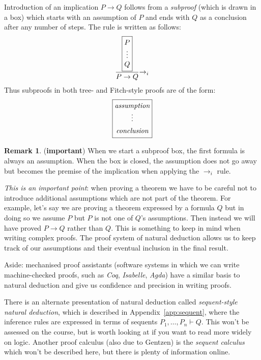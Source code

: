 \documentclass{article}
\theoremstyle{definition}
\newtheorem*{remark}{Remark}
\begin{document}
Introduction of an implication $P \rightarrow Q$ follows from a
\emph{subproof} (which is drawn in a box) which starts with an
assumption of $P$ and ends with $Q$ as a conclusion after any number
of steps. The rule is written as follows:
%
\begin{align*}
\setlength{\arraycolsep}{0em}
\dfrac{\fbox{$\begin{array}{c} P \\ \vdots \\ Q\end{array}$}}
      {P \rightarrow Q} {\rightarrow_i}
\end{align*}
%
Thus subproofs in both tree- and Fitch-style proofs
are of the form:
%
\begin{equation*}
\setlength{\arraycolsep}{0em}
\fbox{$\begin{array}{c} \textit{assumption} \\ \vdots \\[0.5em]
         \textit{conclusion} \end{array}$}
\end{equation*}
%
\begin{remark} (\textbf{important})
%
  When we start a subproof box, the first formula is always an
  assumption. When the box is closed, the assumption does not go away
  but becomes the premise of the implication when applying the
  $\rightarrow_i$ rule.

  \emph{This is an important point}: when proving a theorem we
  have to be careful not to introduce additional assumptions which are
  not part of the theorem. For example, let's say we are proving a
  theorem expressed by a formula $Q$ but in doing so we assume $P$ 
  but $P$ is not one of $Q$'s assumptions.  Then
  instead we will have proved $P \rightarrow Q$ rather than $Q$.  This
  is something to keep in mind when writing complex
  proofs. The proof system of natural deduction allows us to keep
  track of our assumptions and their eventual inclusion in the final
  result.

  Aside: mechanised proof assistants (software systems in which we
  can write machine-checked proofs, such as \emph{Coq},
  \emph{Isabelle}, \emph{Agda}) have a similar basis to
  natural deduction and give us confidence and precision in writing proofs.
\end{remark}
%
There is an alternate presentation of natural deduction called
\emph{sequent-style natural deduction}, which is described in
Appendix~\ref{app:sequent}, where the inference rules are expressed in
terms of sequents $P_1, \ldots, P_n \vdash Q$. This won't be assessed
on the course, but is worth looking at if you want to read more widely
on logic. Another proof calculus (also due to Gentzen) is the
\emph{sequent calculus} which won't be described here, but there is
plenty of information online.
\end{document}
